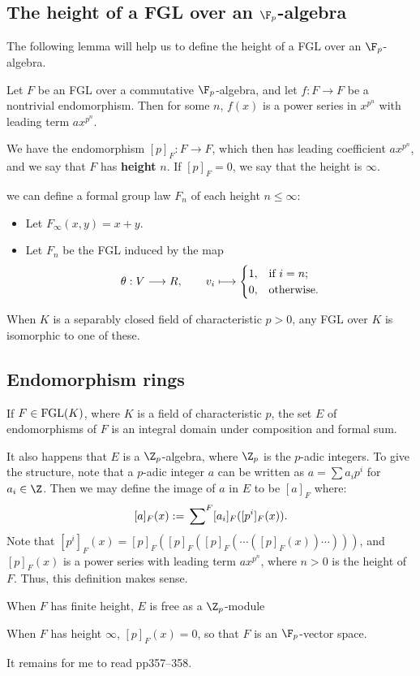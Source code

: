 \documentclass[11pt]{article}
\newcommand\Fsum{\sideset{}{^F}\sum}
\newcommand{\FGL}{\textup{FGL}}
\begin{document}
\begin{Formal Group Laws}
\subsection*{The height of a FGL over an $\F_p$-algebra}
\begin{itemise}
\item The following lemma will help us to define the height of a FGL over an $\F_p$-algebra.
\begin{lem*}[A2.2.6]
Let $F$ be an FGL over a commutative $\F_p$-algebra, and let $f:F\to F$ be a nontrivial endomorphism. Then for some $n$, $f(x)$ is a power series in $x^{p^n}$ with leading term $ax^{p^n}$.
\end{lem*}
\item We have the endomorphism $[p]_F:F\to F$, which then has leading coefficient $ax^{p^n}$, and we say that $F$ has \textbf{height} $n$. If $[p]_F=0$, we say that the height is $\infty$.
\item {} we can define a formal group law $F_n$ of each height $n\leq\infty$:
\begin{itemize}\squishlist
\item Let $F_{\infty}(x,y)=x+y$.
\item Let $F_n$ be the FGL induced by the map
\[\theta:V\to R,\qquad v_i\mapsto\begin{cases}
1,&\textup{if }i=n;\\
0,&\textup{otherwise}.
\end{cases}
\]
\end{itemize}
\item When $K$ is a separably closed field of characteristic $p>0$, any FGL over $K$ is isomorphic to one of these.
\end{itemise}
\subsection*{Endomorphism rings}
\begin{itemise}
\item If $F\in\FGL(K)$, where $K$ is a field of characteristic $p$, the set $E$ of endomorphisms of $F$ is an integral domain under composition and formal sum.
\item It also happens that $E$ is a $\Z_p$-algebra, where $\Z_p$ is the $p$-adic integers. To give the structure, note that a $p$-adic integer $a$ can be written as $a=\sum a_ip^i$ for $a_i\in\Z$. Then we may define the image of $a$ in $E$ to be $[a]_F$ where:
\[[a]_F(x):=\Fsum [a_i]_F([p^i]_F(x)).\]
Note that $[p^i]_F(x)=[p]_F([p]_F([p]_F( \cdots([p]_F(x))\cdots)))$, and $[p]_F(x)$ is a power series with leading term $ax^{p^n}$, where $n>0$ is the height of $F$. Thus, this definition makes sense.

\INDENT When $F$ has finite height, $E$ is free as a $\Z_p$-module 

\INDENT When $F$ has height $\infty$, $[p]_F(x)=0$, so that $F$ is an $\F_p$-vector space.
\item It remains for me to read pp357--358.
\end{itemise}
\end{Formal Group Laws}
\end{document}
